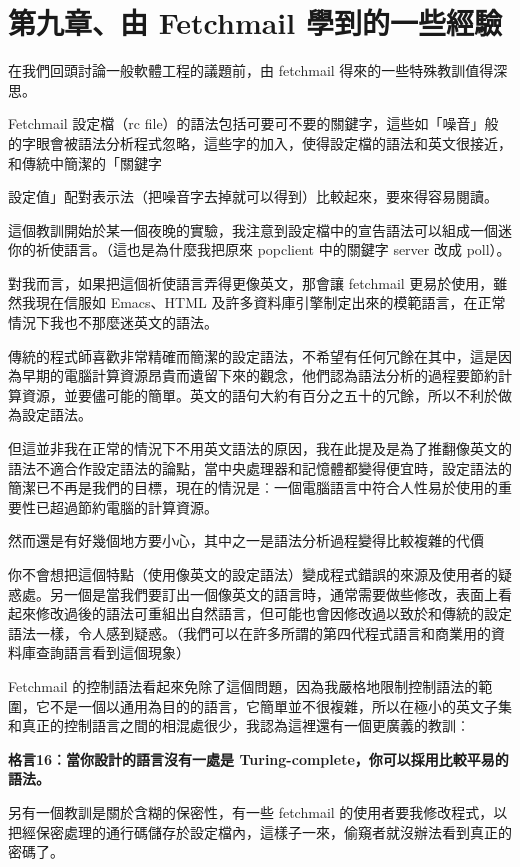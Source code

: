 \documentclass[10pt, b5paper]{book}
\makeatletter
\newcommand*{\shifttext}[2]{%
  \settowidth{\@tempdima}{#2}%
  \makebox[\@tempdima]{\hspace*{#1}#2}%
}
\makeatother
\begin{document}
\newpage
\section{第九章、由 Fetchmail 學到的一些經驗}

在我們回頭討論一般軟體工程的議題前，由 fetchmail
得來的一些特殊教訓值得深思。

Fetchmail 設定檔（rc
file）的語法包括可要可不要的關鍵字，這些如「噪音」般的字眼會被語法分析程式忽略，這些字的加入，使得設定檔的語法和英文很接近，和傳統中簡潔的「關鍵字
\shifttext{1pt}{---}\shifttext{-1pt}{---}
設定值」配對表示法（把噪音字去掉就可以得到）比較起來，要來得容易閱讀。

這個教訓開始於某一個夜晚的實驗，我注意到設定檔中的宣告語法可以組成一個迷你的祈使語言。（這也是為什麼我把原來
popclient 中的關鍵字 server 改成 poll）。

對我而言，如果把這個祈使語言弄得更像英文，那會讓 fetchmail
更易於使用，雖然我現在信服如 Emacs、HTML
及許多資料庫引擎制定出來的模範語言，在正常情況下我也不那麼迷英文的語法。

傳統的程式師喜歡非常精確而簡潔的設定語法，不希望有任何冗餘在其中，這是因為早期的電腦計算資源昂貴而遺留下來的觀念，他們認為語法分析的過程要節約計算資源，並要儘可能的簡單。英文的語句大約有百分之五十的冗餘，所以不利於做為設定語法。

但這並非我在正常的情況下不用英文語法的原因，我在此提及是為了推翻像英文的語法不適合作設定語法的論點，當中央處理器和記憶體都變得便宜時，設定語法的簡潔已不再是我們的目標，現在的情況是︰一個電腦語言中符合人性易於使用的重要性已超過節約電腦的計算資源。

然而還是有好幾個地方要小心，其中之一是語法分析過程變得比較複雜的代價
\shifttext{1pt}{---}\shifttext{-1pt}{---}
你不會想把這個特點（使用像英文的設定語法）變成程式錯誤的來源及使用者的疑惑處。另一個是當我們要訂出一個像英文的語言時，通常需要做些修改，表面上看起來修改過後的語法可重組出自然語言，但可能也會因修改過以致於和傳統的設定語法一樣，令人感到疑惑。（我們可以在許多所謂的第四代程式語言和商業用的資料庫查詢語言看到這個現象）

Fetchmail
的控制語法看起來免除了這個問題，因為我嚴格地限制控制語法的範圍，它不是一個以通用為目的的語言，它簡單並不很複雜，所以在極小的英文子集和真正的控制語言之間的相混處很少，我認為這裡還有一個更廣義的教訓︰

\textbf{格言16︰當你設計的語言沒有一處是
Turing-complete，你可以採用比較平易的語法。}

另有一個教訓是關於含糊的保密性，有一些 fetchmail
的使用者要我修改程式，以把經保密處理的通行碼儲存於設定檔內，這樣子一來，偷窺者就沒辦法看到真正的密碼了。
\end{document}
